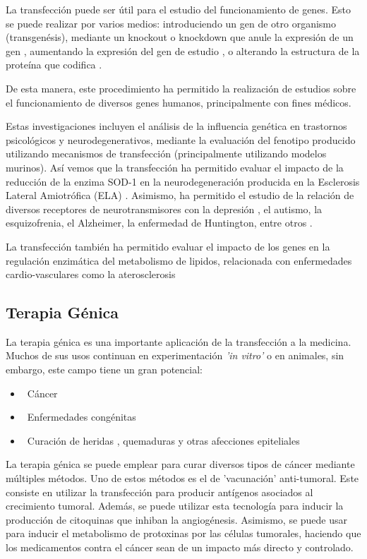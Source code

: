 \documentclass[fleqn,10pt]{SelfArx} %
\begin{document}
La transfección puede ser útil para el estudio del funcionamiento de genes. Esto se puede realizar por varios medios: introduciendo un gen de otro organismo (transgenésis), mediante un knockout o knockdown que anule la expresión de un gen \cite{cryanin2004}, aumentando la expresión del gen de estudio \cite{yanni2004laboratory}, o alterando la estructura de la proteína que codifica \cite{ripps1995transgenic}.

De esta manera, este procedimiento ha permitido la realización de estudios sobre el funcionamiento de diversos genes humanos, principalmente con fines médicos.

Estas investigaciones incluyen el análisis de la influencia genética en trastornos psicológicos y neurodegenerativos, mediante la evaluación del fenotipo producido utilizando mecanismos de transfección (principalmente utilizando modelos murinos). Así vemos que la transfección ha permitido evaluar el impacto de la reducción de la enzima SOD-1 en la neurodegeneración producida en la Esclerosis Lateral Amiotrófica (ELA) \cite{ripps1995transgenic}. Asimismo, ha permitido el estudio de la relación de diversos receptores de neurotransmisores con la depresión \cite{cryanin2004}, el autismo, la esquizofrenia, el Alzheimer, la enfermedad de Huntington, entre otros \cite{anthe2002}.

La transfección también ha permitido evaluar el impacto de los genes en la regulación enzimática del metabolismo de lipidos, relacionada con enfermedades cardio-vasculares como la aterosclerosis\cite{yanni2004laboratory}


\subsection{Terapia Génica}

La terapia génica es una importante aplicación de la transfección a la medicina. Muchos de sus usos continuan en experimentación \textit{'in vitro'} o en animales, sin embargo, este campo tiene un gran potencial:
\begin{itemize}[noitemsep] %
\item \ Cáncer
\item \ Enfermedades congénitas
\item \ Curación de heridas , quemaduras y otras afecciones epiteliales
\end{itemize}

La terapia génica se puede emplear para curar diversos tipos de cáncer mediante múltiples métodos. Uno de estos métodos es el de 'vacunación' anti-tumoral. Este consiste en utilizar la transfección para producir antígenos asociados al crecimiento tumoral. Además, se puede utilizar esta tecnología para inducir la producción de citoquinas que inhiban la angiogénesis. Asimismo, se puede usar para inducir el metabolismo de protoxinas por las células tumorales, haciendo que los medicamentos contra el cáncer sean de un impacto más directo y controlado\cite{Vile, Seung}.
\end{document}
